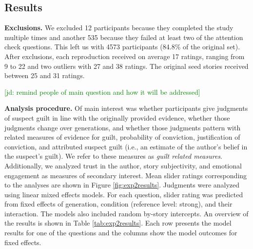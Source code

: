 \documentclass[10pt,letterpaper]{article}
\newcommand{\jd}[1]{\textcolor{Green}{[jd: #1]}}
\begin{document}
\vspace{-.5cm}
\vspace{-.5cm}
\vspace{-.5cm}
\vspace{-.5cm}
\vspace{-.5cm}
\vspace{-.5cm}
\vspace{-.5cm}


\subsection{Results}

\textbf{Exclusions.} We excluded 12 participants because they completed the study multiple times and another 535 because they failed at least two of the attention check questions. This left us with 4573 participants (84.8\% of the original set). After exclusions, each reproduction received on average 17 ratings, ranging from 9 to 22 and two outliers with 27 and 38 ratings. %
The original seed stories received between 25 and 31 ratings.

\jd{remind people of main question and how it will be addressed}

\textbf{Analysis procedure.} Of main interest was whether participants give judgments of suspect guilt in line with the originally provided evidence, whether those judgments change over generations, and whether those judgments pattern with related measures of evidence for guilt, probability of conviction, justification of conviction, and attributed suspect guilt (i.e., an estimate of the author's belief in the suspect's guilt). We refer to these measures as \emph{guilt related measures}. Additionally, we analyzed trust in the author, story subjectivity, and emotional engagement as measures of secondary interest. Mean slider ratings corresponding to the analyses are shown in Figure \ref{fig:exp2results}.  Judgments were analyzed using linear mixed effects models. For each question, slider rating was predicted from fixed effects of generation, condition (reference level: strong), and their interaction. The models also included random by-story intercepts. An overview of the results is shown in Table \ref{tab:exp2results}. Each row presents the model results for one of the questions and the columns show the model outcomes for fixed effects. 
\end{document}
